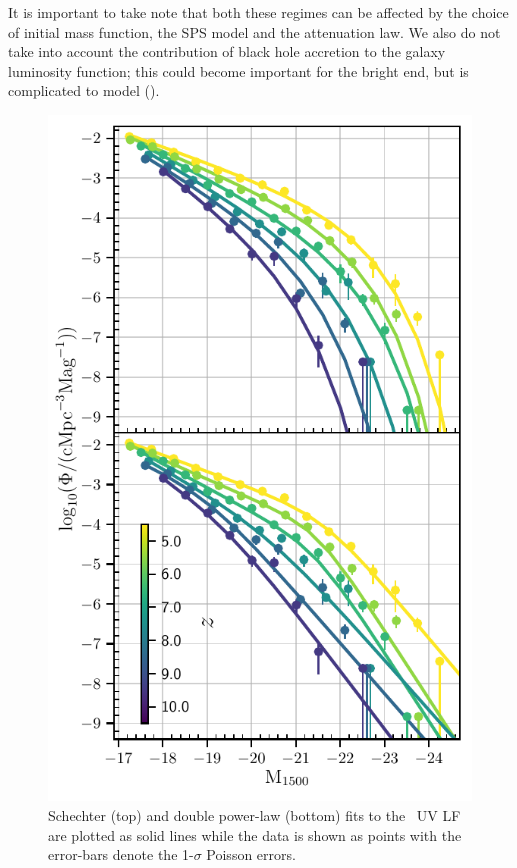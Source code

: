 It is important to take note that both these regimes can be affected by the choice of initial mass function, the SPS model \citep[see][]{Wilkins2016a} and the attenuation law. We also do not take into account the contribution of black hole accretion to the galaxy luminosity function; this could become important for the bright end, but is complicated to model ().
\begin{figure}
	\centering
	\includegraphics[width=\columnwidth]{./figures/LF_FUV_z5_10_Flares-fit}
	\caption{Schechter (top) and double power-law (bottom) fits to the \flares\, UV LF are plotted as solid lines while the data is shown as points with the error-bars denote the 1-$\sigma$ Poisson errors.  \label{fig: LF fit}} 
\end{figure} 
